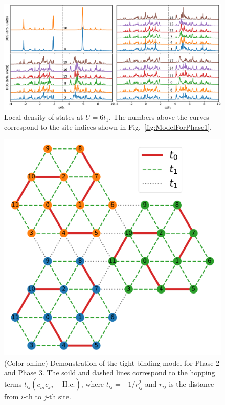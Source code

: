 \documentclass[aps,prb,amsfonts,amsmath,amssymb,showpacs,groupedaddress,superscriptaddress]{revtex4-1}
\begin{document}
\begin{figure}[p]
    \centering
    \includegraphics[width=0.8\columnwidth]{fig/CPTForPhase1LDOS.pdf}
    \caption{\label{fig:CPTForPhase1LDOS} Local density of states at $U = 6 t_{1}$. The numbers above the curves correspond to the site indices shown in Fig.~\ref{fig:ModelForPhase1}.}
\end{figure}

\begin{figure}[p]
    \includegraphics[width=0.8\columnwidth]{fig/ModelForPhase2andPhase3.pdf}
    \caption{\label{fig:ModelForPhase2andPhase3} (Color online) Demonstration of the tight-binding model for Phase 2 and Phase 3. The soild and dashed lines correspond to the hopping terms $t_{ij} (c_{i\sigma}^{\dagger} c_{j\sigma} + \text{H.c.})$, where $t_{ij} = -1/r_{ij}^{2}$ and $r_{ij}$ is the distance from $i$-th to $j$-th site.}
\end{figure}
\end{document}
